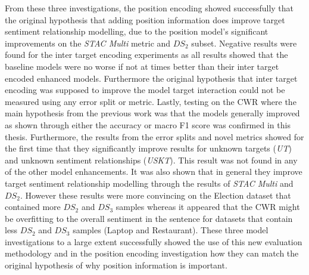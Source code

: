 From these three investigations, the position encoding showed successfully that the original hypothesis that adding position information does improve target sentiment relationship modelling, due to the position model's significant improvements on the \textit{STAC Multi} metric and $DS_2$ subset. Negative results were found for the inter target encoding experiments as all results showed that the baseline models were no worse if not at times better than their inter target encoded enhanced models. Furthermore the original hypothesis that inter target encoding was supposed to improve the model target interaction could not be measured using any error split or metric. Lastly, testing on the CWR where the main hypothesis from the previous work was that the models generally improved as shown through either the accuracy or macro F1 score was confirmed in this thesis. Furthermore, the results from the error splits and novel metrics showed for the first time that they significantly improve results for unknown targets (\textit{UT}) and unknown sentiment relationships (\textit{USKT}). This result was not found in any of the other model enhancements. It was also shown that in general they improve target sentiment relationship modelling through the results of \textit{STAC Multi} and $DS_2$. However these results were more convincing on the Election dataset that contained more $DS_2$ and $DS_3$ samples whereas it appeared that the CWR might be overfitting to the overall sentiment in the sentence for datasets that contain less $DS_2$ and $DS_3$ samples (Laptop and Restaurant). These three model investigations to a large extent successfully showed the use of this new evaluation methodology and in the position encoding investigation how they can match the original hypothesis of why position information is important. %

